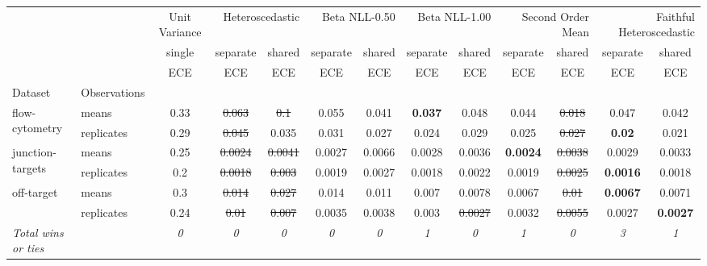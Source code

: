 \begin{tabular}{ll|c|cc|cc|cc|cc|cc}
\toprule
{} & {} & {Unit Variance} & \multicolumn{2}{r}{Heteroscedastic} & \multicolumn{2}{r}{Beta NLL-0.50} & \multicolumn{2}{r}{Beta NLL-1.00} & \multicolumn{2}{r}{Second Order Mean} & \multicolumn{2}{r}{Faithful Heteroscedastic} \\
{} & {} & {single} & {separate} & {shared} & {separate} & {shared} & {separate} & {shared} & {separate} & {shared} & {separate} & {shared} \\
{} & {} & {ECE} & {ECE} & {ECE} & {ECE} & {ECE} & {ECE} & {ECE} & {ECE} & {ECE} & {ECE} & {ECE} \\
{Dataset} & {Observations} & {} & {} & {} & {} & {} & {} & {} & {} & {} & {} & {} \\
\midrule
\multirow[t]{2}{*}{flow-cytometry} & means & 0.33 & \sout{0.063} & \sout{0.1} & 0.055 & 0.041 & \textbf{0.037} & 0.048 & 0.044 & \sout{0.018} & 0.047 & 0.042 \\
 & replicates & 0.29 & \sout{0.045} & 0.035 & 0.031 & 0.027 & 0.024 & 0.029 & 0.025 & \sout{0.027} & \textbf{0.02} & 0.021 \\
\multirow[t]{2}{*}{junction-targets} & means & 0.25 & \sout{0.0024} & \sout{0.0041} & 0.0027 & 0.0066 & 0.0028 & 0.0036 & \textbf{0.0024} & \sout{0.0038} & 0.0029 & 0.0033 \\
 & replicates & 0.2 & \sout{0.0018} & \sout{0.003} & 0.0019 & 0.0027 & 0.0018 & 0.0022 & 0.0019 & \sout{0.0025} & \textbf{0.0016} & 0.0018 \\
\multirow[t]{2}{*}{off-target} & means & 0.3 & \sout{0.014} & \sout{0.027} & 0.014 & 0.011 & 0.007 & 0.0078 & 0.0067 & \sout{0.01} & \textbf{0.0067} & 0.0071 \\
 & replicates & 0.24 & \sout{0.01} & \sout{0.007} & 0.0035 & 0.0038 & 0.003 & \sout{0.0027} & 0.0032 & \sout{0.0055} & 0.0027 & \textbf{0.0027} \\
\textit{{Total wins or ties}} &  & \textit{0} & \textit{0} & \textit{0} & \textit{0} & \textit{0} & \textit{1} & \textit{0} & \textit{1} & \textit{0} & \textit{3} & \textit{1} \\
\bottomrule
\end{tabular}
